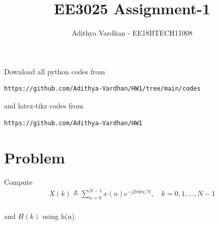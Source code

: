 \documentclass[journal,12pt,twocolumn]{IEEEtran}
\begin{document}
     \def\rightbox#1{\makebox[0in][r]{#1}}
     \def\centbox#1{\makebox[0in]{#1}}
     \def\topbox#1{\raisebox{-\baselineskip}[0in][0in]{#1}}
     \def\midbox#1{\raisebox{-0.5\baselineskip}[0in][0in]{#1}}
\vspace{3cm}
\title{EE3025 Assignment-1}
\author{Adithya Vardhan - EE18BTECH11008}
\maketitle
\newpage
\bigskip
\renewcommand{\thefigure}{\theenumi}
\renewcommand{\thetable}{\theenumi}
Download all python codes from 
\begin{lstlisting}
https://github.com/Adithya-Vardhan/HW1/tree/main/codes
\end{lstlisting}
%
and latex-tikz codes from 
%
\begin{lstlisting}
https://github.com/Adithya-Vardhan/HW1
\end{lstlisting}
\section{Problem}

Compute 
\begin{align}
	X(k) \triangleq \sum_{n=0}^{N-1} x(n) e^{-j 2 \pi k n / N}, \quad k=0,1, \ldots, N-1
\end{align}\\
and $H(k)$ using h(n).
\end{document}
